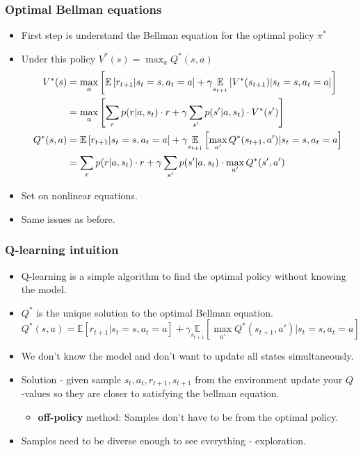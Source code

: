\documentclass[handout]{beamer}
\renewcommand{\high}{\textbf}
\begin{document}
\begin{frame}\frametitle{Optimal Bellman equations}\small
\begin{itemize}
	\item First step is understand the Bellman equation for the optimal policy $\pi^*$
	\onslide<2->\item Under this policy $V^*(s)=\max_a Q^*(s,a)$
		{\footnotesize
		\begin{align*}\footnotesize
		V^*(s)& = \max_a\left[\mathbb{E}\left[r_{t+1} |s_t=s,a_t=a\right] +\gamma \underset{s_{t+1}}{\mathbb{E}}\left[V^{*}(s_{t+1})|s_t=s,a_t=a\right]\right] \\
		&= \max_a\left[\sum_{r}p(r|a,s_t)\cdot r+\gamma \sum_{s'}p(s'|a,s_t)\cdot V^*(s')\right] \\
		Q^*(s,a)&=\mathbb{E}\left[r_{t+1} |s_t=s,a_t=a\right]+ \gamma\underset{s_{t+1}}{\mathbb{E}}\left[\max_{a'}Q^{*}(s_{t+1},a')|s_t=s,a_t=a\right] \\
		&= \sum_{r}p(r|a,s_t)\cdot r+\gamma \sum_{s'}p(s'|a,s_t)\cdot\max_{a'} Q^*(s',a')
		\end{align*}}
	\onslide<3-> \item Set on nonlinear equations.
	\onslide<4-> \item Same issues as before.
	
\end{itemize}
\end{frame}


\begin{frame}\frametitle{Q-learning intuition}\small
\begin{itemize}
	\item Q-learning is a simple algorithm to find the optimal policy without knowing the model.
		\onslide<2->\item $Q^*$ is the unique solution to the optimal Bellman equation.
	\[
	Q^*(s,a)=\mathbb{E}\left[r_{t+1} |s_t=s,a_t=a\right]+ \gamma\underset{s_{t+1}}{\mathbb{E}}\left[\max_{a'}Q^{*}(s_{t+1},a')|s_t=s,a_t=a\right]
	\]
	\onslide<3->\item We don't know the model and don't want to update all states simultaneously.
	\onslide<4->\item Solution - given sample $s_t,a_t,r_{t+1},s_{t+1}$ from the environment update your $Q$-values so they are closer to satisfying the bellman equation.
	\begin{itemize}
		\item \high{off-policy} method: Samples don't have to be from the optimal policy.

	\end{itemize} 
	\item Samples need to be diverse enough to see everything - exploration.
\end{itemize}
\end{frame}
\end{document}
